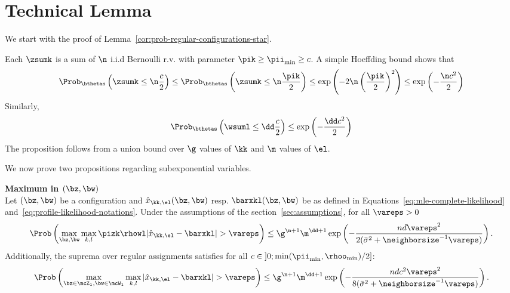 \section{Technical Lemma}
\label{sec:technical-lemma}


We start with the proof of Lemma~\ref{cor:prob-regular-configurations-star}. 

\proofbegin
Each $\zsumk$ is a sum of $\n$ i.i.d Bernoulli r.v. with parameter $\pik \geq \pii_{\min} \geq c$. A simple Hoeffding bound shows that
\begin{equation*}
  \Prob_{\bthetas}\left( \zsumk \leq \n \frac{c}{2} \right)
  \leq
  \Prob_{\bthetas}\left( \zsumk \leq \n \frac{\pik}{2} \right)
  \leq
  \exp\left( - 2\n\left(\frac{\pik}{2}\right)^2 \right)
  \leq
  \exp\left( - \frac{\n c^2}{2} \right)
\end{equation*}
Similarly,
\begin{equation*}
  \Prob_{\bthetas}\left( \wsuml \leq \dd \frac{c}{2} \right) \leq \exp\left( - \frac{\dd c^2}{2} \right)
\end{equation*}
The proposition follows from a union bound over $\g$ values of $\kk$ and $\m$ values of $\el$.
\proofend

We now prove two propositions regarding subexponential variables. 

\begin{proposition}\label{proposition:maxzw}\textbf{Maximum in $(\bz, \bw)$}\\
  Let $(\bz, \bw)$ be a configuration and $\hat{x}_{\kk, \el}(\bz, \bw)$ resp. $\barxkl(\bz, \bw)$ be as defined in Equations~\eqref{eq:mle-complete-likelihood} and~\eqref{eq:profile-likelihood-notations}. Under the assumptions of the section~\ref{sec:assumptions}, for all $\vareps>0$
  \begin{equation}
    \label{eq:ineg-de-bernst-1}
    \Prob \left(\max_{\bz, \bw} \max_{k,l} \pizk \rhowl |\hat{x}_{\kk, \el} - \barxkl| > \vareps \right)  \leq  \g^{\n+1} \m^{\dd + 1} \exp \left( - \frac{nd\vareps^2}{2(\bar{\sigma}^2 + \neighborsize^{-1}\vareps)}\right). \\
  \end{equation}
  Additionally, the suprema over regular assignments satisfies for all $c\in\left]0;\min(\pii_{\min},\rhoo_{\min}) / 2\right]$:
  \begin{equation}
    \label{eq:ineg-de-bernst-2}
    \Prob \left(\max_{\bz \in \mcZ_1, \bw \in \mcW_1} \max_{k,l} |\hat{x}_{\kk, \el} - \barxkl| > \vareps \right) \leq  \g^{\n+1} \m^{\dd + 1} \exp \left( - \frac{ndc^2\vareps^2}{8(\bar{\sigma}^2 + \neighborsize^{-1}\vareps)}\right). \\
  \end{equation}
\end{proposition}


